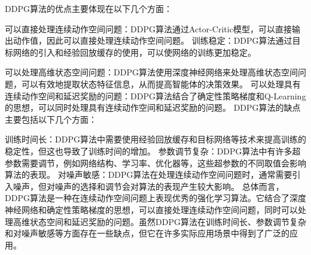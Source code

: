DDPG算法的优点主要体现在以下几个方面：

可以直接处理连续动作空间问题：DDPG算法通过Actor-Critic模型，可以直接输出动作值，因此可以直接处理连续动作空间问题。
训练稳定：DDPG算法通过目标网络的引入和经验回放缓存的使用，可以使网络的训练更加稳定。

可以处理高维状态空间问题：DDPG算法使用深度神经网络来处理高维状态空间问题，可以有效地提取状态特征信息，从而提高智能体的决策效果。
可以处理具有连续动作空间和延迟奖励的问题：DDPG算法结合了确定性策略梯度和Q-Learning的思想，可以同时处理具有连续动作空间和延迟奖励的问题。
DDPG算法的缺点主要包括以下几个方面：

训练时间长：DDPG算法中需要使用经验回放缓存和目标网络等技术来提高训练的稳定性，但这也导致了训练时间的增加。
参数调节复杂：DDPG算法中有许多超参数需要调节，例如网络结构、学习率、优化器等，这些超参数的不同取值会影响算法的表现。
对噪声敏感：DDPG算法在处理连续动作空间问题时，通常需要引入噪声，但对噪声的选择和调节会对算法的表现产生较大影响。
总体而言，DDPG算法是一种在连续动作空间问题上表现优秀的强化学习算法。它结合了深度神经网络和确定性策略梯度的思想，可以直接处理连续动作空间问题，同时可以处理高维状态空间和延迟奖励的问题。虽然DDPG算法在训练时间长、参数调节复杂和对噪声敏感等方面存在一些缺点，但它在许多实际应用场景中得到了广泛的应用。
